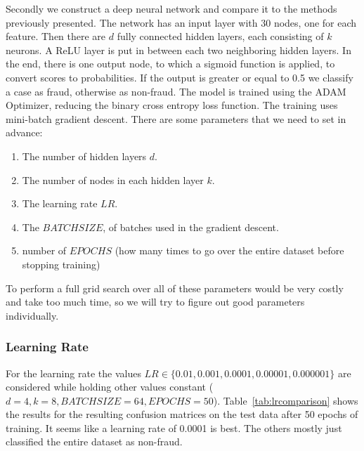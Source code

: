 \documentclass[utf8x]{ctexart}
\begin{document}
Secondly we construct a deep neural network and compare it to the methods previously presented.
The network has an input layer with 30 nodes, one for each feature. Then there are $d$ fully connected hidden layers, each consisting of $k$ neurons. A ReLU layer is put in between each two neighboring hidden layers. In the end, there is one output node, to which a sigmoid function is applied, to convert scores to probabilities. If the output is greater or equal to 0.5 we classify a case as fraud, otherwise as non-fraud.
The model is trained using the ADAM Optimizer, reducing the binary cross entropy loss function. The training uses mini-batch gradient descent.
There are some parameters that we need to set in advance:
\begin{enumerate}
  \item The number of hidden layers $d$.
  \item The number of nodes in each hidden layer $k$.
  \item The learning rate $LR$.
  \item The $BATCH SIZE$, of batches used in the gradient descent.
  \item number of $EPOCHS$ (how many times to go over the entire dataset before stopping training)
\end{enumerate}
To perform a full grid search over all of these parameters would be very costly and take too much time, so we will try to figure out good parameters individually.

\subsubsection{Learning Rate}

For the learning rate the values $LR \in \{0.01, 0.001, 0.0001, 0.00001, 0.000001\}$ are considered while holding other values constant ($d=4,k=8, BATCH SIZE=64, EPOCHS=50$).
Table~\ref{tab:lrcomparison} shows the results for the resulting confusion matrices on the test data after 50 epochs of training. It seems like a learning rate of 0.0001 is best. The others mostly just classified the entire dataset as non-fraud.
\end{document}
